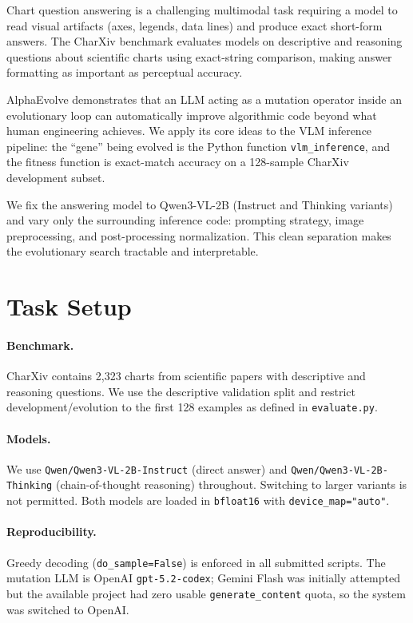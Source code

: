 \documentclass{article}
\begin{document}
Chart question answering is a challenging multimodal task requiring a model to
read visual artifacts (axes, legends, data lines) and produce exact short-form
answers. The CharXiv benchmark \cite{charxiv} evaluates models on descriptive
and reasoning questions about scientific charts using exact-string comparison,
making answer formatting as important as perceptual accuracy.

AlphaEvolve \cite{alphaevolve} demonstrates that an LLM acting as a mutation
operator inside an evolutionary loop can automatically improve algorithmic code
beyond what human engineering achieves. We apply its core ideas to the VLM
inference pipeline: the ``gene'' being evolved is the Python function
\texttt{vlm\_inference}, and the fitness function is exact-match accuracy on a
128-sample CharXiv development subset.

We fix the answering model to Qwen3-VL-2B \cite{qwen} (Instruct and Thinking
variants) and vary only the surrounding inference code: prompting strategy,
image preprocessing, and post-processing normalization. This clean separation
makes the evolutionary search tractable and interpretable.

\section{Task Setup}

\paragraph{Benchmark.}
CharXiv contains 2{,}323 charts from scientific papers with descriptive and
reasoning questions. We use the descriptive validation split and restrict
development/evolution to the first 128 examples as defined in
\texttt{evaluate.py}.

\paragraph{Models.}
We use \texttt{Qwen/Qwen3-VL-2B-Instruct} (direct answer) and
\texttt{Qwen/Qwen3-VL-2B-Thinking} (chain-of-thought reasoning) throughout.
Switching to larger variants is not permitted. Both models are loaded in
\texttt{bfloat16} with \texttt{device\_map="auto"}.

\paragraph{Reproducibility.}
Greedy decoding (\texttt{do\_sample=False}) is enforced in all submitted
scripts. The mutation LLM is OpenAI \texttt{gpt-5.2-codex}; Gemini Flash was
initially attempted but the available project had zero usable
\texttt{generate\_content} quota, so the system was switched to OpenAI.
\end{document}
